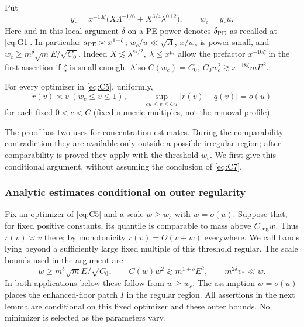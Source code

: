 Put
\[
 y_c=x^{-10\zeta}\big(X\Lambda^{-1/6}+X^{3/4}\lambda^{0.12}\big),\qquad w_c=y_c u .
\]
Here and in this local argument \(\delta\) on a PE power denotes \(\delta_{\rm PE}\) as recalled at \eqref{eq:G1}. In particular \(a_{\rm PE}\asymp x^{1-\zeta}\); \(w_c/u\ll\sqrt\Lambda\), \(x/w_c\) is power small, and
\(w_c\ge m^\delta\sqrt m E/\sqrt{C_0}\). Indeed \(X\lesssim\lambda^{s_*/2},\ \lambda\le x^{p_*}\) allow the prefactor \(x^{-10\zeta}\) in the first assertion if \(\zeta\) is small enough. Also \(C(w_c)=C_0,\ C_0 w_c^2\gtrsim x^{-18\zeta}mE^2\).
\begin{proposition}\label{bud:coarse-profile}
For every optimizer in \eqref{eq:C5}, uniformly,
\[
 r(v)\asymp v\ (w_c\le v\le1),\qquad
 \sup_{c u\le v\le C u}|r(v)-q(v)|=o(u)                                 \tag{C7}\label{eq:C7}
\]
for each fixed \(0<c<C\) (fixed numeric multiples, not the removal profile). \end{proposition}

The proof has two uses for concentration estimates. During the
comparability contradiction they are available only outside a possible
irregular region; after comparability is proved they apply with the
threshold $w_c$. We first give this conditional argument, without assuming
the conclusion of \eqref{eq:C7}.

\subsubsection{Analytic estimates conditional on outer regularity}

Fix an optimizer of \eqref{eq:C5} and a scale $w\ge w_c$ with
$w=o(u)$. Suppose that, for fixed positive constants, its quantile is
comparable to mass above $C_{\rm reg}w$. Thus $r(v)\asymp v$ there;
by monotonicity $r(v)=O(v+w)$ everywhere. We call bands lying beyond a
sufficiently large fixed multiple of this threshold regular. The scale
bounds used in the argument are
\[
 w\ge m^\delta\sqrt m E/\sqrt{C_0},\qquad
 C(w)w^2\gtrsim m^{1+\delta}E^2,\qquad m^{2\delta}v_*\ll w.
\]
In both applications below these follow from $w\ge w_c$. The assumption
$w=o(u)$ places the enhanced-floor patch $I$ in the regular region.
All assertions in the next lemma are conditional on this fixed optimizer
and these outer bounds. No minimizer is selected as the parameters vary.

